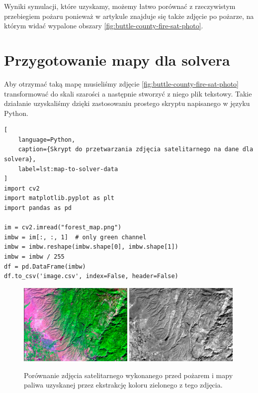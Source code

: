 \documentclass{article}
\begin{document}
    Wyniki symulacji, które uzyskamy, możemy łatwo porównać z rzeczywistym przebiegiem pożaru ponieważ w artykule znajduje się także zdjęcie po pożarze, na którym widać wypalone obszary \ref{fig:buttle-county-fire-sat-photo}.
    
\section{Przygotowanie mapy dla solvera}
\label{sec:prepare-map-for-solver}
    Aby otrzymać taką mapę musieliśmy zdjęcie \ref{fig:buttle-county-fire-sat-photo} transformować do skali szarości a następnie stworzyć z niego plik tekstowy. Takie działanie uzyskaliśmy dzięki zastosowaniu prostego skryptu napisanego w języku Python.

\begin{lstlisting}[
    language=Python,
    caption={Skrypt do przetwarzania zdjęcia satelitarnego na dane dla solvera},
    label=lst:map-to-solver-data
]
import cv2
import matplotlib.pyplot as plt
import pandas as pd

im = cv2.imread("forest_map.png")
imbw = im[:, :, 1]  # only green channel
imbw = imbw.reshape(imbw.shape[0], imbw.shape[1])
imbw = imbw / 255
df = pd.DataFrame(imbw)
df.to_csv('image.csv', index=False, header=False)
\end{lstlisting}

    \begin{figure}[!htpb]
        \centering
        \includegraphics[width=0.49\textwidth]{resources/forest_map.png}\hfill
        \includegraphics[width=0.49\textwidth]{resources/forest_map_gray.png}
        \caption{Porównanie zdjęcia satelitarnego wykonanego przed pożarem i mapy paliwa uzyskanej przez ekstrakcję koloru zielonego z tego zdjęcia.}
        \label{bw-comparison}
    \end{figure}
\end{document}

